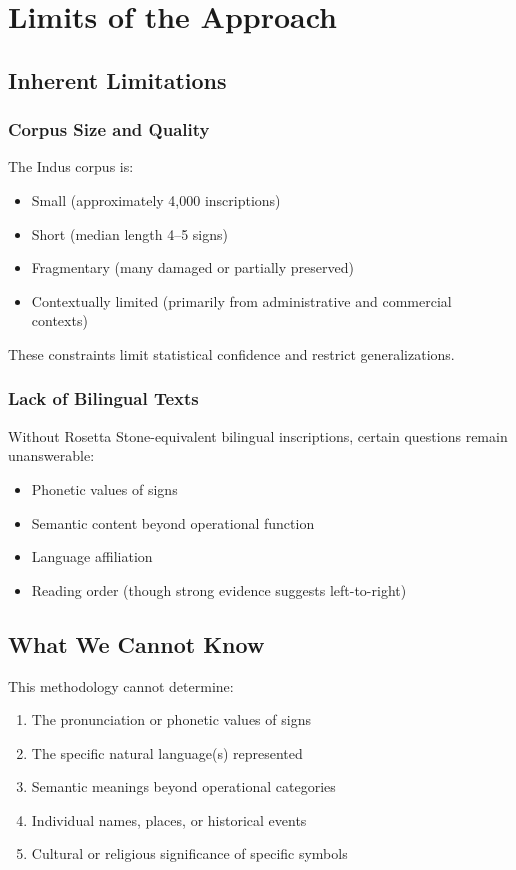 \section{Limits of the Approach}

\subsection{Inherent Limitations}

\subsubsection{Corpus Size and Quality}
The Indus corpus is:
\begin{itemize}
    \item Small (approximately 4,000 inscriptions)
    \item Short (median length 4--5 signs)
    \item Fragmentary (many damaged or partially preserved)
    \item Contextually limited (primarily from administrative and commercial contexts)
\end{itemize}

These constraints limit statistical confidence and restrict generalizations.

\subsubsection{Lack of Bilingual Texts}
Without Rosetta Stone-equivalent bilingual inscriptions, certain questions remain unanswerable:
\begin{itemize}
    \item Phonetic values of signs
    \item Semantic content beyond operational function
    \item Language affiliation
    \item Reading order (though strong evidence suggests left-to-right)
\end{itemize}

\subsection{What We Cannot Know}

This methodology cannot determine:
\begin{enumerate}
    \item The pronunciation or phonetic values of signs
    \item The specific natural language(s) represented
    \item Semantic meanings beyond operational categories
    \item Individual names, places, or historical events
    \item Cultural or religious significance of specific symbols
\end{enumerate}

